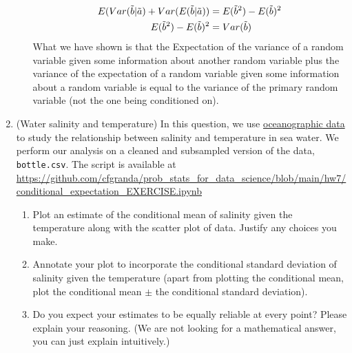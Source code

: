 \documentclass[12pt,twoside]{article}
\newcommand{\rnd}{\Tilde}
\newcommand{\rb}{\rnd{ b}  }
\newcommand{\ra}{\rnd{ a}  }
\begin{document}
\begin{enumerate}
\begin{enumerate}
\begin{equation}
\begin{split}
        E(Var(\rb|\ra) + Var(E(\rb|\ra)) &= E(\rb^2) - E(\rb)^2 \\
        E(\rb^2) - E(\rb)^2 &= Var(\rb)
    \end{split}
\end{equation}
What we have shown is that the Expectation of the variance of a random variable given some information about another random variable plus the variance of the expectation of a random variable given some information about a random variable is equal to the variance of the primary random variable (not the one being conditioned on). 
\end{enumerate}

\item (Water salinity and temperature)  %
In this question, we use \href{https://www.kaggle.com/sohier/calcofi}{oceanographic data } to study the relationship between salinity and temperature in sea water. We perform our analysis on a cleaned and subsampled version of the data, \texttt{bottle.csv}.  %
The script is available at \url{https://github.com/cfgranda/prob_stats_for_data_science/blob/main/hw7/conditional_expectation_EXERCISE.ipynb}
\begin{enumerate}
\item Plot an estimate of the conditional mean of salinity given the temperature along with the scatter plot of data. Justify any choices you make. %
\item Annotate your plot to incorporate the conditional standard deviation of salinity given the temperature (apart from plotting the conditional mean, plot the conditional mean $\pm$ the conditional standard deviation).
\item Do you expect your estimates to be equally reliable at every point? Please explain your reasoning. (We are not looking for a mathematical answer, you can just explain intuitively.)


\end{enumerate}
\end{enumerate}
\end{document}
